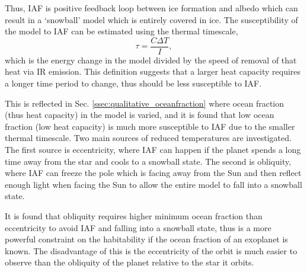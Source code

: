 \documentclass[12pt, onecolumn]{revtex4-2}    %
\begin{document}
Thus, IAF is positive feedback loop between ice formation and albedo which can result in a `snowball' model which is entirely covered in ice.
The susceptibility of the model to IAF can be estimated using the thermal timescale,
\begin{equation}
  \tau = \frac{C \Delta T}{I},
  \label{eq:ThermalTimescale}
\end{equation}
which is the energy change in the model divided by the speed of removal of that heat via IR emission.
This definition suggests that a larger heat capacity requires a longer time period to change, thus should be less susceptible to IAF.

This is reflected in Sec. \ref{ssec:qualitative_oceanfraction} where ocean fraction (thus heat capacity) in the model is varied, and it is found that low ocean fraction (low heat capacity) is much more susceptible to IAF due to the smaller thermal timescale.
Two main sources of reduced temperatures are investigated.
The first source is eccentricity, where IAF can happen if the planet spends a long time away from the star and cools to a snowball state.
The second is obliquity, where IAF can freeze the pole which is facing away from the Sun and then reflect enough light when facing the Sun to allow the entire model to fall into a snowball state.

It is found that obliquity requires higher minimum ocean fraction than eccentricity to avoid IAF and falling into a snowball state, thus is a more powerful constraint on the habitability if the ocean fraction of an exoplanet is known. The disadvantage of this is the eccentricity of the orbit is much easier to observe than the obliquity of the planet relative to the star it orbits.

%
\end{document}
